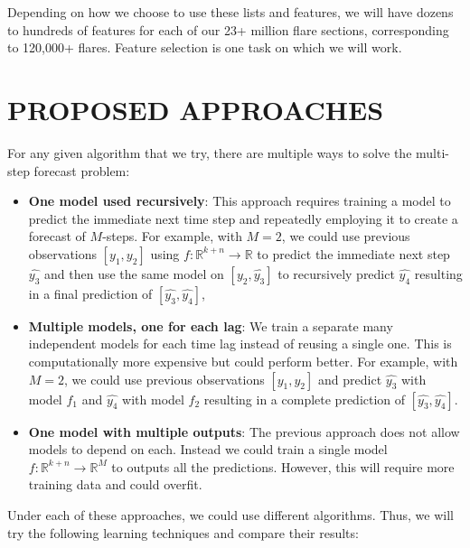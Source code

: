 \documentclass[letterpaper, 10 pt, onecolumn]{ieeeconf}
\begin{document}
Depending on how we choose to use these lists and features, we will have dozens to hundreds of features for each of our 23+ million flare sections, corresponding to 120,000+ flares. Feature selection is one task on which we will work.

\newpage 

\section{PROPOSED APPROACHES}\label{sec:approaches}
For any given algorithm that we try, there are multiple ways to solve the multi-step forecast problem:
\begin{itemize}
    \item \textbf{One model used recursively}: This approach requires training a model to predict the immediate next time step and repeatedly employing it to create a forecast of $M$-steps. For example, with $M=2$, we could use previous observations $[y_1, y_2]$ using $f:\mathbb{R}^{k+n} \to \mathbb{R}$ to predict the immediate next step $\hat{y_3}$ and then use the same model on $[y_2, \hat{y_3}]$ to recursively predict $\hat{y_4}$ resulting in a final prediction of $[\hat{y_3}, \hat{y_4}]$,
    \item \textbf{Multiple models, one for each lag}: We train a separate many independent models for each time lag instead of reusing a single one. This is computationally more expensive but could perform better. For example, with $M=2$, we could use previous observations $[y_1, y_2]$ and predict $\hat{y_3}$ with model $f_1$ and $\hat{y_4}$ with model $f_2$ resulting in a complete prediction of $[\hat{y_3}, \hat{y_4}]$. 
    \item \textbf{One model with multiple outputs}: The previous approach does not allow models to depend on each. Instead we could train a single model $f:\mathbb{R}^{k+n}\to\mathbb{R}^M$ to outputs all the predictions. However, this will require more training data and could overfit. 
\end{itemize}
Under each of these approaches, we could use different algorithms. Thus, we will try the following learning techniques and compare their results:
\end{document}

